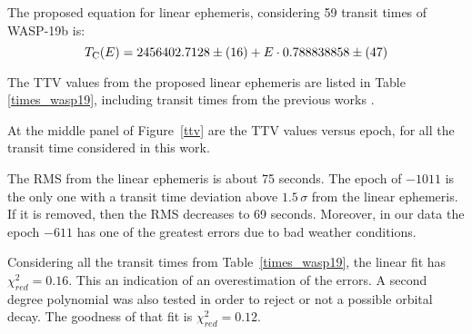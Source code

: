 The proposed equation for linear ephemeris, considering 59 transit times of WASP-19b is:
\begin{equation} \label{eq1_w19}
T_{\rm C}(E)=2456402.7128\pm(16)+E \cdot 0.788838858\pm(47)
\end{equation}

The TTV values from the proposed linear ephemeris are listed in Table \ref{times_wasp19}, including transit times from the previous works \citep{Hebb2010,Anderson2010,Lendl2013,Tregloan2013,Bean2013,Mancini2013}. 

At the middle panel of Figure~\ref{ttv} are the TTV values versus epoch, for all the transit time considered in this work.

The RMS from the linear ephemeris is about 75 seconds. The epoch of $-1011$ is the only one with a transit time deviation above $1.5\,\sigma$ from the linear ephemeris. If it is removed, then the RMS decreases to 69 seconds. Moreover, in our data the epoch $-611$ has one of the greatest errors due to bad weather conditions.

Considering all the transit times from Table~\ref{times_wasp19}, the linear fit has $\chi^{2}_{red} = 0.16$. This an indication of an overestimation of the errors. A second degree polynomial was also tested in order to reject or not a possible orbital decay. The goodness of that fit is $\chi^{2}_{red}=0.12$. 

